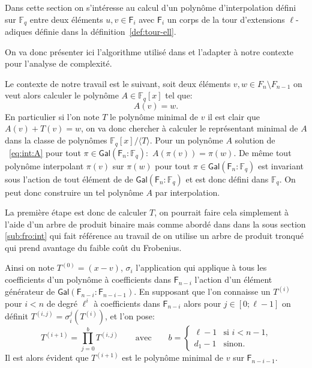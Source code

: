 \documentclass[10pt,a4paper]{book}
\theoremstyle{plain}
\theoremstyle{definition}
\theoremstyle{definition}
\theoremstyle{definition}
\theoremstyle{definition}
\theoremstyle{definition}
\theoremstyle{remark}
\theoremstyle{remark}
\theoremstyle{definition}
\begin{document}
Dans cette section on s'intéresse au calcul d'un polynôme d'interpolation défini
 sur $\mathbb{F}_q$ entre deux éléments $u,v \in \mathsf{F}_i$ avec 
 $\mathsf{F}_i$ un corps de la tour d'extensions $\ell$-adiques 
  définie dans la définition~\ref{def:tour-ell}.  
  
  
 On va donc présenter ici l'algorithme utilisé dans \cite[8.7]{DeFeo10} et
 l'adapter à notre contexte pour l'analyse de complexité. 


Le contexte de notre travail est le suivant, soit deux éléments $v,w \in F_n
\setminus F_{n-1}$ on veut alors calculer le polynôme $A \in \mathbb{F}_q[x]$ 
tel que:
\begin{equation}
\label{eq:int:A}
A(v)=w.
\end{equation}
En particulier si l'on note $T$ le polynôme minimal de $v$ il est clair que 
 $A(v)+T(v)=w$, on va donc chercher à calculer le représentant minimal de 
$A$ dans la classe de polynômes $\mathbb{F}_q[x]/ \langle T \rangle$.
Pour un polynôme $A$ solution de ~\ref{eq:int:A} pour tout 
$\pi \in \mathsf{Gal}(\mathsf{F}_n : \mathbb{F}_q):$ $A(\pi(v))=\pi(w)$. De même
tout polynôme interpolant $\pi(v)$ sur $\pi(w)$ pour tout 
$\pi \in \mathsf{Gal}(\mathsf{F}_n : \mathbb{F}_q)$ est invariant sous l'action
de tout élément de de $\mathsf{Gal}(\mathsf{F}_n : \mathbb{F}_q)$ et est donc 
défini dans $\mathbb{F}_q$. On peut donc construire un tel polynôme $A$ par 
interpolation. 

La première étape est donc de calculer $T$, on pourrait faire  cela simplement 
à l'aide d'un arbre de produit binaire mais comme abordé dans dans la sous 
section \ref{sub:fro:int} qui fait référence au travail de \cite[8.7]{DeFeo10}
on utilise un arbre de produit tronqué qui prend avantage du faible coût du 
Frobenius.

Ainsi on note $T^{(0)}=(x-v)$, $\sigma_i$ l'application qui applique à tous les
 coefficients d'un polynôme à coefficients dans $\mathsf{F}_{n-i}$ l'action 
 d'un élément générateur de $\mathsf{Gal}(\mathsf{F}_{n-i} : \mathsf{F}_{n-i-1})$. En 
 supposant que l'on connaisse un $T^{(i)}$ pour $i < n$ de degré $\ell^i$ à 
 coefficients dans $\mathsf{F}_{n-i}$ alors pour $j \in [0 ; \ell-1]$ on définit
 $T^{(i,j)}=\sigma_i^j(T^{(i)})$, et l'on pose:  
\begin{equation*}
T^{(i+1)}=\prod_{j=0}^bT^{(i,j)} \qquad\text{avec}\qquad
  b = \begin{cases}
    \ell-1 &\text{si $i<n-1$,}\\
    d_1-1 &\text{sinon.}
  \end{cases}
\end{equation*}
Il est alors évident que $T^{(i+1)}$ est le polynôme minimal de $v$ sur 
$\mathsf{F}_{n-i-1}$.
\end{document}
